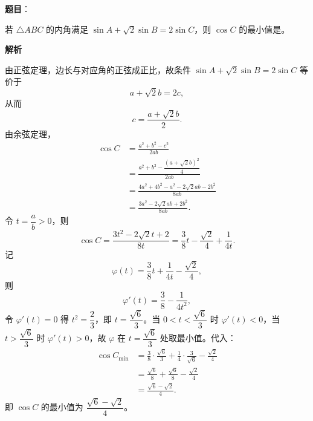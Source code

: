 \begin{answer}

\textbf{题目}：

若 $\triangle ABC$ 的内角满足 $\sin A+\sqrt2\sin B=2\sin C$，则 $\cos C$ 的最小值是\gkblank{}。

\textbf{解析}

由正弦定理，边长与对应角的正弦成正比，故条件 $\sin A+\sqrt2\sin B=2\sin C$ 等价于
\nopagebreak[4]
\[a+\sqrt2b=2c,\]
从而
\nopagebreak[4]
\[c=\frac{a+\sqrt2b}2.\]
由余弦定理，
\nopagebreak[4]
\[\begin{aligned}
\cos C&=\frac{a^2+b^2-c^2}{2ab}\\
&=\frac{a^2+b^2-\dfrac{(a+\sqrt2b)^2}4}{2ab}\\
&=\frac{4a^2+4b^2-a^2-2\sqrt2ab-2b^2}{8ab}\\
&=\frac{3a^2-2\sqrt2ab+2b^2}{8ab}.
\end{aligned}\]
令 $t=\dfrac ab>0$，则
\nopagebreak[4]
\[\cos C=\frac{3t^2-2\sqrt2t+2}{8t}=\frac38t-\frac{\sqrt2}4+\frac1{4t}.\]
记
\nopagebreak[4]
\[\varphi(t)=\frac38t+\frac1{4t}-\frac{\sqrt2}4,\]
则
\nopagebreak[4]
\[\varphi'(t)=\frac38-\frac1{4t^2},\]
令 $\varphi'(t)=0$ 得 $t^2=\dfrac23$，即 $t=\dfrac{\sqrt6}3$。当 $0<t<\dfrac{\sqrt6}3$ 时 $\varphi'(t)<0$，当 $t>\dfrac{\sqrt6}3$ 时 $\varphi'(t)>0$，故 $\varphi$ 在 $t=\dfrac{\sqrt6}3$ 处取最小值。代入：
\nopagebreak[4]
\[\begin{aligned}
\cos C_{\min}
&=\frac38\cdot\frac{\sqrt6}3+\frac1{4}\cdot\frac{3}{\sqrt6}-\frac{\sqrt2}4\\
&=\frac{\sqrt6}8+\frac{\sqrt6}8-\frac{\sqrt2}4\\
&=\frac{\sqrt6-\sqrt2}4.
\end{aligned}\]
即 $\cos C$ 的最小值为 $\dfrac{\sqrt6-\sqrt2}4$。


\end{answer}
